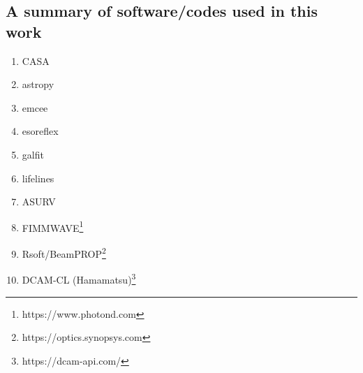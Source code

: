 


\subsection*{A summary of software/codes used in this work}

\begin{enumerate}
\item
  CASA \cite{emonts2019casa} \vspace{-1ex}

\item
  astropy \cite{robitaille2013astropy} \vspace{-1ex}

\item
  emcee \cite{foreman2013emcee} \vspace{-1ex}

\item
esoreflex \cite{freudling2013automated} \vspace{-1ex}

\item
galfit \cite{peng2003galfit} \vspace{-1ex}

\item
lifelines \cite{cameron_davidson_pilon_2020_3962065} \vspace{-1ex}

\item
ASURV \cite{feigelson1985statistical, isobe1986statistical, isobe1990asurv} \vspace{-1ex}

\item 
FIMMWAVE\footnote{https://www.photond.com} \vspace{-1ex}

\item
Rsoft/BeamPROP\footnote{https://optics.synopsys.com} \vspace{-1ex}

\item
DCAM-CL (Hamamatsu)\footnote{https://dcam-api.com/} \vspace{-1ex}

\end{enumerate}

